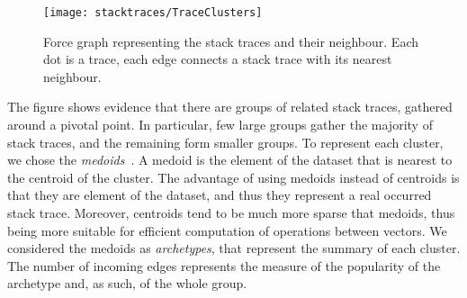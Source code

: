 \begin{figure}[h!t]
\begin{center}
  \texttt{[image: stacktraces/TraceClusters]}
  \caption{Force graph representing the stack traces and their neighbour.
  Each dot is a trace, each edge connects a stack trace with its nearest neighbour.}
  \label{fig:eva-clusters}
\end{center}
\end{figure}

The figure shows evidence that there are groups of related stack traces, gathered around a pivotal point.
In particular, few large groups gather the majority of stack traces, and the remaining form smaller groups.
To represent each cluster, we chose the \emph{medoids}~\cite{Kauf1987}.
A medoid is the element of the dataset that is nearest to the centroid of the cluster.
The advantage of using medoids instead of centroids is that they are element of the dataset, and thus they represent a real occurred stack trace.
Moreover, centroids tend to be much more sparse that medoids, thus being more suitable for efficient computation of operations between vectors.
We considered the medoids as \emph{archetypes}, that represent the summary of each cluster.
The number of incoming edges represents the measure of the popularity of the archetype and, as such, of the whole group.


